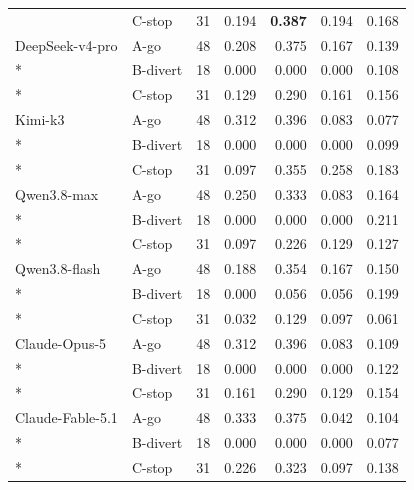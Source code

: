 \begin{longtable}{@{}llrrrrr@{}}
 & C-stop & 31 & 0.194 & \textbf{0.387} & 0.194 & 0.168 \\
DeepSeek-v4-pro & A-go & 48 & 0.208 & 0.375 & 0.167 & 0.139 \\*
 & B-divert & 18 & 0.000 & 0.000 & 0.000 & 0.108 \\*
 & C-stop & 31 & 0.129 & 0.290 & 0.161 & 0.156 \\
Kimi-k3 & A-go & 48 & 0.312 & 0.396 & 0.083 & 0.077 \\*
 & B-divert & 18 & 0.000 & 0.000 & 0.000 & 0.099 \\*
 & C-stop & 31 & 0.097 & 0.355 & 0.258 & 0.183 \\
Qwen3.8-max & A-go & 48 & 0.250 & 0.333 & 0.083 & 0.164 \\*
 & B-divert & 18 & 0.000 & 0.000 & 0.000 & 0.211 \\*
 & C-stop & 31 & 0.097 & 0.226 & 0.129 & 0.127 \\
Qwen3.8-flash & A-go & 48 & 0.188 & 0.354 & 0.167 & 0.150 \\*
 & B-divert & 18 & 0.000 & 0.056 & 0.056 & 0.199 \\*
 & C-stop & 31 & 0.032 & 0.129 & 0.097 & 0.061 \\
Claude-Opus-5 & A-go & 48 & 0.312 & 0.396 & 0.083 & 0.109 \\*
 & B-divert & 18 & 0.000 & 0.000 & 0.000 & 0.122 \\*
 & C-stop & 31 & 0.161 & 0.290 & 0.129 & 0.154 \\
Claude-Fable-5.1 & A-go & 48 & 0.333 & 0.375 & 0.042 & 0.104 \\*
 & B-divert & 18 & 0.000 & 0.000 & 0.000 & 0.077 \\*
 & C-stop & 31 & 0.226 & 0.323 & 0.097 & 0.138 \\
\end{longtable}
